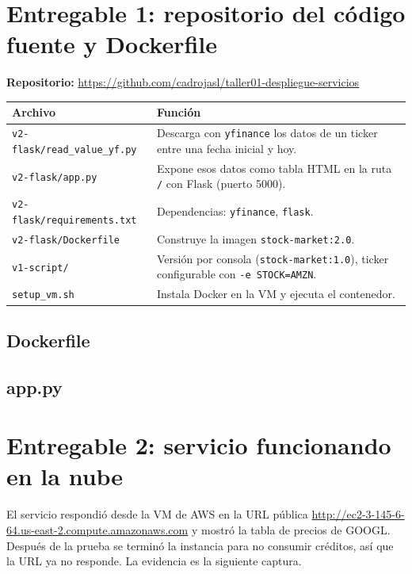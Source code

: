 \documentclass[11pt,a4paper]{article}
\begin{document}
\section{Entregable 1: repositorio del código fuente y Dockerfile}

\textbf{Repositorio:} \url{https://github.com/cadrojasl/taller01-despliegue-servicios}

\begin{center}
\begin{tabular}{@{}lp{10cm}@{}}
\toprule
\textbf{Archivo} & \textbf{Función} \\
\midrule
\texttt{v2-flask/read\_value\_yf.py} & Descarga con \texttt{yfinance} los datos de un ticker entre una fecha inicial y hoy. \\
\texttt{v2-flask/app.py} & Expone esos datos como tabla HTML en la ruta \texttt{/} con Flask (puerto 5000). \\
\texttt{v2-flask/requirements.txt} & Dependencias: \texttt{yfinance}, \texttt{flask}. \\
\texttt{v2-flask/Dockerfile} & Construye la imagen \texttt{stock-market:2.0}. \\
\texttt{v1-script/} & Versión por consola (\texttt{stock-market:1.0}), ticker configurable con \texttt{-e STOCK=AMZN}. \\
\texttt{setup\_vm.sh} & Instala Docker en la VM y ejecuta el contenedor. \\
\bottomrule
\end{tabular}
\end{center}

\subsection*{Dockerfile}


\subsection*{app.py}


\section{Entregable 2: servicio funcionando en la nube}
El servicio respondió desde la VM de AWS en la URL pública
\url{http://ec2-3-145-6-64.us-east-2.compute.amazonaws.com} y mostró la tabla de precios de GOOGL. Después de la prueba se terminó la instancia para no consumir créditos, así que la URL ya no responde. La evidencia es la siguiente captura.
\end{document}

